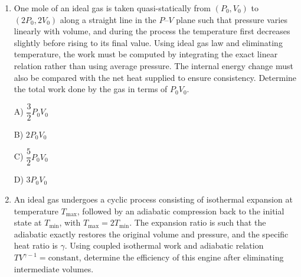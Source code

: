 \documentclass[12pt]{article}
\begin{document}
\begin{enumerate}[leftmargin=*]

\item One mole of an ideal gas is taken quasi-statically from $(P_0,V_0)$ to $(2P_0,2V_0)$ along a straight line in the $P$–$V$ plane such that pressure varies linearly with volume, and during the process the temperature first decreases slightly before rising to its final value. Using ideal gas law and eliminating temperature, the work must be computed by integrating the exact linear relation rather than using average pressure. The internal energy change must also be compared with the net heat supplied to ensure consistency. Determine the total work done by the gas in terms of $P_0V_0$.

A) $\dfrac{3}{2}P_0V_0$

B) $2P_0V_0$

C) $\dfrac{5}{2}P_0V_0$

D) $3P_0V_0$

\item An ideal gas undergoes a cyclic process consisting of isothermal expansion at temperature $T_{\max}$, followed by an adiabatic compression back to the initial state at $T_{\min}$, with $T_{\max}=2T_{\min}$. The expansion ratio is such that the adiabatic exactly restores the original volume and pressure, and the specific heat ratio is $\gamma$. Using coupled isothermal work and adiabatic relation $TV^{\gamma-1}=\text{constant}$, determine the efficiency of this engine after eliminating intermediate volumes.

\begin{center}
\end{center}
\end{enumerate}
\end{document}
